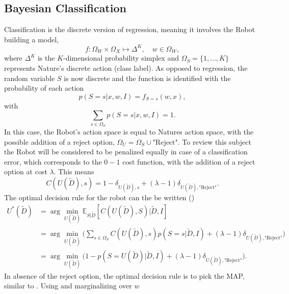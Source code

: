 \subsection{Bayesian Classification}
\label{chp:baycl}
Classification is the discrete version of regression, meaning it involves the Robot building a model,\begin{equation}
	f: \Omega_W \times \Omega_X \mapsto \Delta^K, \quad w \in \Omega_W,
\end{equation}
where $\Delta^K$ is the $K$-dimensional probability simplex and $\Omega_S = \{1,\dots,K\}$ represents Nature's discrete action (class label). As opposed to regression, the random variable $S$ is now discrete and the function is identified with the probability of each action
\begin{equation}
	p(S = s|x,w,I)= f_{S = s}(w,x),
	\label{f_dist2}
\end{equation}
with
\begin{equation}
	\sum_{s\in \Omega_S} p(S = s|x,w,I) = 1.
\end{equation}
In this case, the Robot's action space is equal to Natures action space, with the possible addition of a reject option, $\Omega_U=\Omega_S\cup \text{"Reject"}$. To review this subject the Robot will be considered to be penalized equally in case of a classification error, which corresponds to the $0-1$ cost function, with the addition of a reject option at cost $\lambda$. This means
\begin{equation}
	C(U(\tilde{D}),s) = 1- \delta_{U(\tilde{D}),s}+(\lambda-1)\delta_{U(\tilde{D}),\text{"Reject"}}.
\end{equation}
The optimal decision rule for the robot can the be written ()
\begin{equation}
	\begin{split}
		U^*(\tilde{D}) & = \arg\min_{U(\tilde{D})}\mathbb{E}_{S|\tilde{D}}[C(U(\tilde{D}), S)|\tilde{D},I]\\
		&= \arg\min_{U(\tilde{D})}\bigg(\sum_{s\in \Omega_S}C(U(\tilde{D}),s)p(S = s|\tilde{D},I)+(\lambda-1)\delta_{U(\tilde{D}),\text{"Reject"}}\bigg)\\
		& = \arg\min_{U(\tilde{D})}\bigg(1- p(S=U(\tilde{D})|\tilde{D},I)+(\lambda-1)\delta_{U(\tilde{D}),\text{"Reject"}}\bigg).
	\end{split}
	\label{eq:expected_cost1}
\end{equation}
In absence of the reject option, the optimal decision rule is to pick the MAP, similar to . Using  and marginalizing over $w$
